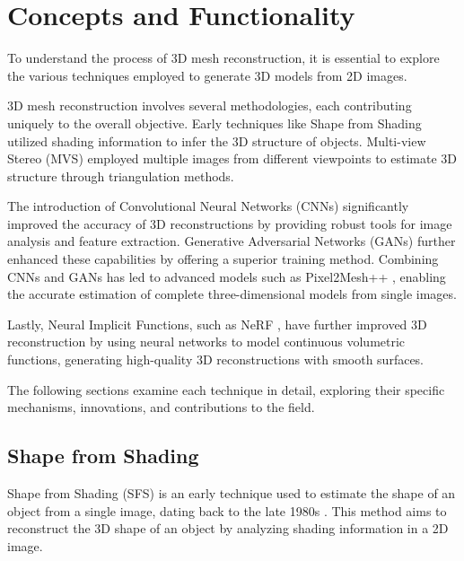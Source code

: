 

\section{Concepts and Functionality}
To understand the process of 3D mesh reconstruction, it is essential to explore the various techniques employed to generate 3D models from 2D images.

3D mesh reconstruction involves several methodologies, each contributing uniquely to the overall objective. Early techniques like Shape from Shading \autocite{horn_shape_1989} utilized shading information to infer the 3D structure of objects. Multi-view Stereo (MVS) employed multiple images from different viewpoints to estimate 3D structure through triangulation methods.

The introduction of Convolutional Neural Networks (CNNs) significantly improved the accuracy of 3D reconstructions by providing robust tools for image analysis and feature extraction. Generative Adversarial Networks (GANs) \autocite{goodfellow_generative_2014} further enhanced these capabilities by offering a superior training method.
Combining CNNs and GANs has led to advanced models such as Pixel2Mesh++ \autocite{wen_pixel2mesh_2019}, enabling the accurate estimation of complete three-dimensional models from single images.

Lastly, Neural Implicit Functions, such as NeRF \autocite{mildenhall_nerf_2021}, have further improved 3D reconstruction by using neural networks to model continuous volumetric functions, generating high-quality 3D reconstructions with smooth surfaces.

The following sections examine each technique in detail, exploring their specific mechanisms, innovations, and contributions to the field.

\subsection{Shape from Shading}
Shape from Shading (SFS) is an early technique used to estimate the shape of an object from a single image, dating back to the late 1980s \textcite{horn_shape_1989}. This method aims to reconstruct the 3D shape of an object by analyzing shading information in a 2D image.

